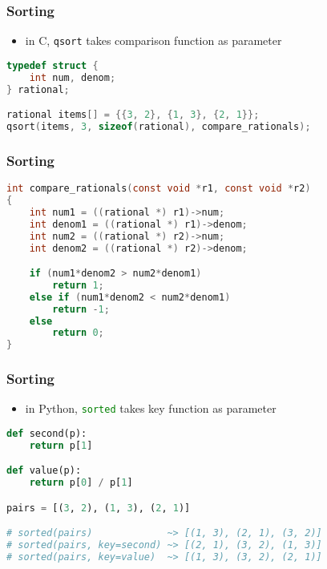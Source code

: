 \documentclass[dvipsnames]{beamer}
\theoremstyle{plain}
\begin{document}
\begin{frame}[fragile]
  \frametitle{Sorting}


  \begin{exampleblock}{}
    \begin{itemize}
      \item in C, \lstinline[language=C]{qsort} takes comparison function
        as parameter
    \end{itemize}

    \begin{lstlisting}[language=C]
typedef struct {
    int num, denom;
} rational;

rational items[] = {{3, 2}, {1, 3}, {2, 1}};
qsort(items, 3, sizeof(rational), compare_rationals);
    \end{lstlisting}
  \end{exampleblock}
\end{frame}

\begin{frame}[fragile]
  \frametitle{Sorting}

  \begin{exampleblock}{}
    \begin{lstlisting}[language=C]
int compare_rationals(const void *r1, const void *r2)
{
    int num1 = ((rational *) r1)->num;
    int denom1 = ((rational *) r1)->denom;
    int num2 = ((rational *) r2)->num;
    int denom2 = ((rational *) r2)->denom;

    if (num1*denom2 > num2*denom1)
        return 1;
    else if (num1*denom2 < num2*denom1)
        return -1;
    else
        return 0;
}
    \end{lstlisting}
  \end{exampleblock}
\end{frame}

\begin{frame}[fragile]
  \frametitle{Sorting}

  \begin{exampleblock}{}
    \begin{itemize}
      \item in Python, \lstinline[language=Python]{sorted} takes key function
        as parameter
    \end{itemize}

    \begin{lstlisting}[language=Python]
def second(p):
    return p[1]

def value(p):
    return p[0] / p[1]

pairs = [(3, 2), (1, 3), (2, 1)]

# sorted(pairs)             ~> [(1, 3), (2, 1), (3, 2)]
# sorted(pairs, key=second) ~> [(2, 1), (3, 2), (1, 3)]
# sorted(pairs, key=value)  ~> [(1, 3), (3, 2), (2, 1)]
    \end{lstlisting}
  \end{exampleblock}
\end{frame}
\end{document}
